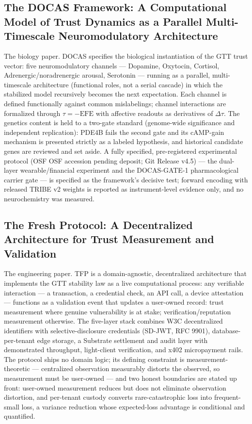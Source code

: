 \documentclass[11pt]{article}
\begin{document}
\subsection*{The DOCAS Framework: A Computational Model of Trust Dynamics as a Parallel Multi-Timescale Neuromodulatory Architecture}

The biology paper. DOCAS specifies the biological instantiation of the GTT trust
vector: five neuromodulatory channels --- Dopamine, Oxytocin, Cortisol,
Adrenergic/noradrenergic arousal, Serotonin --- running as a parallel,
multi-timescale architecture (functional roles, not a serial cascade) in which
the stabilized model recursively becomes the next expectation. Each channel is
defined functionally against common mislabelings; channel interactions are
formalized through $\tau = -\mathrm{EFE}$ with affective readouts as derivatives
of $\Delta\tau$. The genetics content is held to a two-gate standard
(genome-wide significance and independent replication): PDE4B fails the second
gate and its cAMP-gain mechanism is presented strictly as a labeled hypothesis,
and historical candidate genes are reviewed and set aside. A fully specified, pre-registered experimental protocol (OSF OSF accession pending deposit; Git Release v4.5) --- the dual-layer wearable/financial experiment and the DOCAS-GATE-1 pharmacological carrier gate --- is specified as the framework's decisive test; forward encoding with released TRIBE v2 weights is reported as instrument-level evidence only, and no neurochemistry was measured.

\subsection*{The Fresh Protocol: A Decentralized Architecture for Trust Measurement and Validation}

The engineering paper. TFP is a domain-agnostic, decentralized architecture that
implements the GTT stability law as a live computational process: any verifiable
interaction --- a transaction, a credential check, an API call, a device
attestation --- functions as a validation event that updates a user-owned
record: trust measurement where genuine vulnerability is at stake;
verification/reputation measurement otherwise. The five-layer stack combines W3C decentralized identifiers with
selective-disclosure credentials (SD-JWT, RFC 9901), database-per-tenant edge
storage, a Substrate settlement and audit layer with demonstrated throughput,
light-client verification, and x402 micropayment rails. The protocol ships no
domain logic; its defining constraint is measurement-theoretic --- centralized
observation measurably distorts the observed, so measurement must be user-owned
--- and two honest boundaries are stated up front: user-owned measurement
reduces but does not eliminate observation distortion, and per-tenant custody
converts rare-catastrophic loss into frequent-small loss, a variance reduction
whose expected-loss advantage is conditional and quantified.
\end{document}
